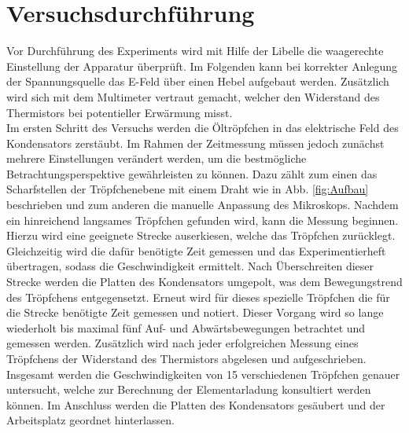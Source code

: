 \section{Versuchsdurchführung}
\label{sec:Versuchsdurchführung}

\noindent Vor Durchführung des Experiments wird mit Hilfe der Libelle die waagerechte Einstellung der Apparatur überprüft. Im 
Folgenden kann bei korrekter Anlegung der Spannungsquelle das E-Feld über einen Hebel aufgebaut werden. Zusätzlich wird sich mit 
dem Multimeter vertraut gemacht, welcher den Widerstand des Thermistors bei potentieller Erwärmung misst.\\

Im ersten Schritt des Versuchs werden die Öltröpfchen in das elektrische Feld des Kondensators zerstäubt. Im Rahmen der Zeitmessung 
müssen jedoch zunächst mehrere Einstellungen verändert werden, um die bestmögliche Betrachtungsperspektive gewährleisten zu 
können. Dazu zählt zum einen das Scharfstellen der Tröpfchenebene mit einem Draht wie in Abb. \ref{fig:Aufbau} beschrieben und zum
anderen die manuelle Anpassung des Mikroskops. Nachdem ein hinreichend langsames Tröpfchen gefunden wird, kann die Messung beginnen.
Hierzu wird eine geeignete Strecke auserkiesen, welche das Tröpfchen zurücklegt. Gleichzeitig wird die dafür benötigte Zeit gemessen
und das Experimentierheft übertragen, sodass die Geschwindigkeit ermittelt. Nach Überschreiten dieser Strecke werden die Platten
des Kondensators umgepolt, was dem Bewegungstrend des Tröpfchens entgegensetzt. Erneut wird für dieses spezielle Tröpfchen die für 
die Strecke benötigte Zeit gemessen und notiert. Dieser Vorgang wird so lange wiederholt bis maximal fünf Auf- und 
Abwärtsbewegungen betrachtet und gemessen werden. Zusätzlich wird nach jeder erfolgreichen Messung eines Tröpfchens der Widerstand 
des Thermistors abgelesen und aufgeschrieben.\\

\noindent Insgesamt werden die Geschwindigkeiten von 15 verschiedenen Tröpfchen genauer untersucht, welche zur Berechnung der
Elementarladung konsultiert werden können. Im Anschluss werden die Platten des Kondensators gesäubert und der Arbeitsplatz geordnet
hinterlassen.
